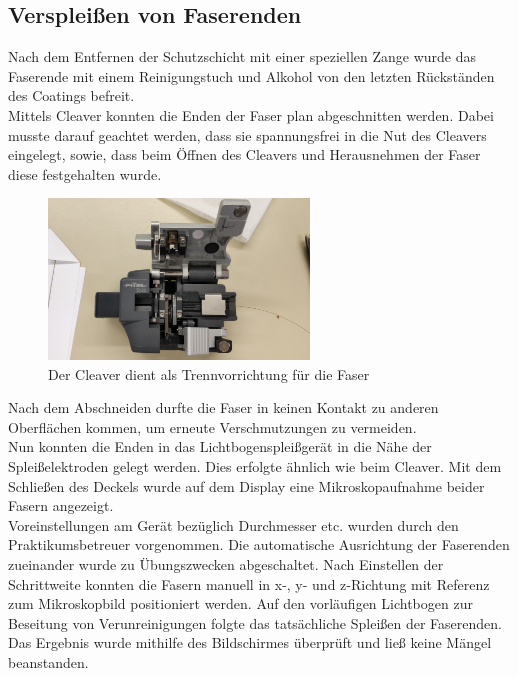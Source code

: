\subsection{Verspleißen von Faserenden}
Nach dem Entfernen der Schutzschicht mit einer speziellen Zange wurde das Faserende mit einem Reinigungstuch und Alkohol von den letzten Rückständen des Coatings befreit.\\


Mittels Cleaver konnten die Enden der Faser plan abgeschnitten werden. Dabei musste darauf geachtet werden, dass sie spannungsfrei in die Nut des Cleavers eingelegt, sowie, dass beim Öffnen des Cleavers und Herausnehmen der Faser diese festgehalten wurde.\\

\begin{figure}[H]
\centering
\includegraphics[width=0.618\textwidth]{graphics/cleavi.jpg}
\caption{Der Cleaver dient als Trennvorrichtung für die Faser}
\end{figure}


Nach dem Abschneiden durfte die Faser in keinen Kontakt zu anderen Oberflächen kommen, um erneute Verschmutzungen zu vermeiden.\\

Nun konnten die Enden in das Lichtbogenspleißgerät in die Nähe der Spleißelektroden gelegt werden. Dies erfolgte ähnlich wie beim Cleaver. Mit dem Schließen des Deckels wurde auf dem Display eine Mikroskopaufnahme beider Fasern angezeigt.\\

Voreinstellungen am Gerät bezüglich Durchmesser etc. wurden durch den Praktikumsbetreuer vorgenommen. Die automatische Ausrichtung der Faserenden zueinander wurde zu Übungszwecken abgeschaltet. Nach Einstellen der Schrittweite konnten die Fasern manuell in x-, y- und z-Richtung mit Referenz zum Mikroskopbild positioniert werden. Auf den vorläufigen Lichtbogen zur Beseitung von Verunreinigungen folgte das tatsächliche Spleißen der Faserenden. Das Ergebnis wurde mithilfe des Bildschirmes überprüft und ließ keine Mängel beanstanden.

